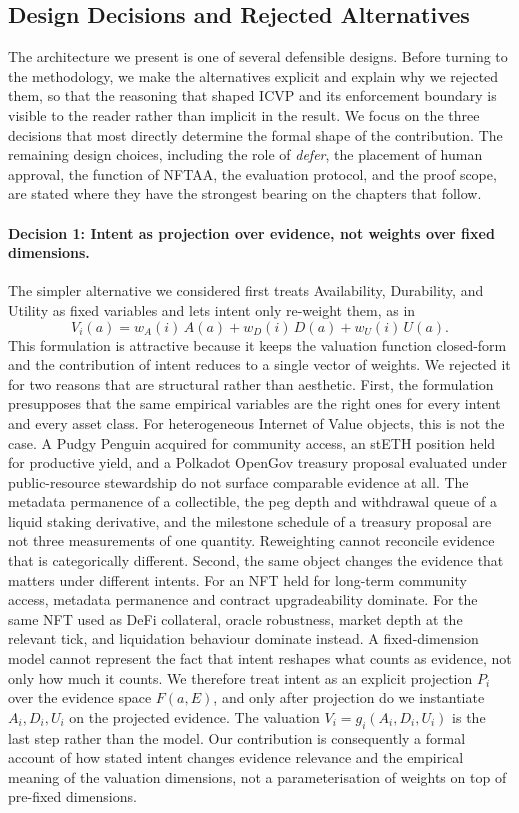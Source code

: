 \subsection{Design Decisions and Rejected Alternatives}
\label{sec:design-decisions}

The architecture we present is one of several defensible designs. Before turning to the methodology, we make the alternatives explicit and explain why we rejected them, so that the reasoning that shaped ICVP and its enforcement boundary is visible to the reader rather than implicit in the result. We focus on the three decisions that most directly determine the formal shape of the contribution. The remaining design choices, including the role of \textit{defer}, the placement of human approval, the function of NFTAA, the evaluation protocol, and the proof scope, are stated where they have the strongest bearing on the chapters that follow.

\paragraph{Decision 1: Intent as projection over evidence, not weights over fixed dimensions.}
The simpler alternative we considered first treats Availability, Durability, and Utility as fixed variables and lets intent only re-weight them, as in
\[
V_i(a) = w_A(i)\, A(a) + w_D(i)\, D(a) + w_U(i)\, U(a).
\]
This formulation is attractive because it keeps the valuation function closed-form and the contribution of intent reduces to a single vector of weights. We rejected it for two reasons that are structural rather than aesthetic. First, the formulation presupposes that the same empirical variables are the right ones for every intent and every asset class. For heterogeneous Internet of Value objects, this is not the case. A Pudgy Penguin acquired for community access, an stETH position held for productive yield, and a Polkadot OpenGov treasury proposal evaluated under public-resource stewardship do not surface comparable evidence at all. The metadata permanence of a collectible, the peg depth and withdrawal queue of a liquid staking derivative, and the milestone schedule of a treasury proposal are not three measurements of one quantity. Reweighting cannot reconcile evidence that is categorically different. Second, the same object changes the evidence that matters under different intents. For an NFT held for long-term community access, metadata permanence and contract upgradeability dominate. For the same NFT used as DeFi collateral, oracle robustness, market depth at the relevant tick, and liquidation behaviour dominate instead. A fixed-dimension model cannot represent the fact that intent reshapes what counts as evidence, not only how much it counts. We therefore treat intent as an explicit projection $P_i$ over the evidence space $F(a, E)$, and only after projection do we instantiate $A_i, D_i, U_i$ on the projected evidence. The valuation $V_i = g_i(A_i, D_i, U_i)$ is the last step rather than the model. Our contribution is consequently a formal account of how stated intent changes evidence relevance and the empirical meaning of the valuation dimensions, not a parameterisation of weights on top of pre-fixed dimensions.

